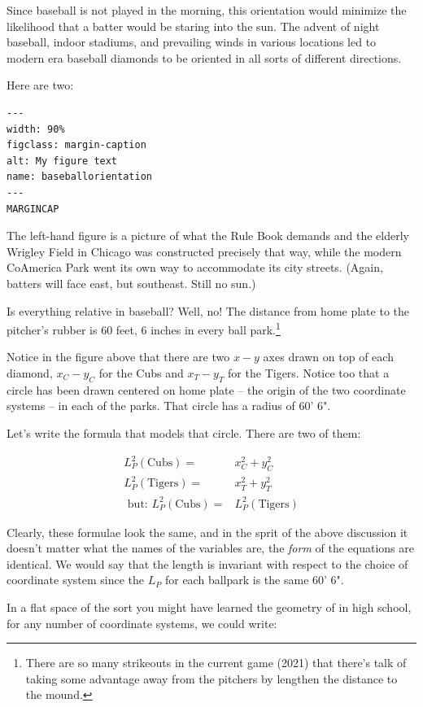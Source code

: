 \documentclass[
]{article}
\begin{document}
Since baseball is not played in the morning, this orientation would
minimize the likelihood that a batter would be staring into the sun. The
advent of night baseball, indoor stadiums, and prevailing winds in
various locations led to modern era baseball diamonds to be oriented in
all sorts of different directions.

Here are two:

\begin{verbatim}
---
width: 90%
figclass: margin-caption
alt: My figure text
name: baseballorientation
---
MARGINCAP
\end{verbatim}

The left-hand figure is a picture of what the Rule Book demands and the
elderly Wrigley Field in Chicago was constructed precisely that way,
while the modern CoAmerica Park went its own way to accommodate its city
streets. (Again, batters will face east, but southeast. Still no sun.)

Is everything relative in baseball? Well, no! The distance from home
plate to the pitcher's rubber is 60 feet, 6 inches in every ball
park.\footnote{There are so many strikeouts in the current game (2021)
  that there's talk of taking some advantage away from the pitchers by
  lengthen the distance to the mound.}

Notice in the figure above that there are two \(x-y\) axes drawn on top
of each diamond, \(x_C-y_C\) for the Cubs and \(x_T-y_T\) for the
Tigers. Notice too that a circle has been drawn centered on home plate
-- the origin of the two coordinate systems -- in each of the parks.
That circle has a radius of 60' 6".

Let's write the formula that models that circle. There are two of them:

\begin{align*}
L_P^2(\text{Cubs}) =& x_C^2+y_C^2 \\
L_P^2(\text{Tigers}) =& x_T^2 + y_T^2  \\
\text{ but:  } L_P^2(\text{Cubs}) =& L_P^2(\text{Tigers})
\end{align*}

Clearly, these formulae look the same, and in the sprit of the above
discussion it doesn't matter what the names of the variables are, the
\emph{form} of the equations are identical. We would say that the length
is invariant with respect to the choice of coordinate system since the
\(L_P\) for each ballpark is the same 60' 6".

In a flat space of the sort you might have learned the geometry of in
high school, for any number of coordinate systems, we could write:
\end{document}
